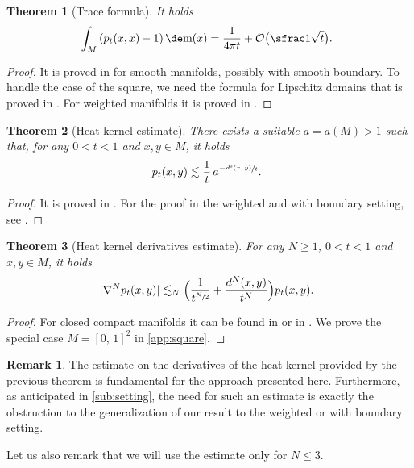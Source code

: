 \documentclass[10pt]{amsart}
\theoremstyle{plain}
\newtheorem{theorem}[theorem]{Theorem}
\theoremstyle{definition}
\newtheorem{remark}[remark]{Remark}
\numberwithin{equation}{section}
\newcommand{\bigo}{\ensuremath{\mathcal{O}}}
\newcommand{\cc}[2]{\ensuremath{\left[#1,\,#2\right]}}
\newcommand{\fullstop}{\ensuremath{\text{. }}}
\newcommand{\m}{\ensuremath{\mathrm m}}
\DeclarePairedDelimiter\abs{\lvert}{\rvert}
\begin{document}
\begin{theorem}[Trace formula]\label{thm:heat_ondiag}
It holds
\begin{equation*}
\int_M \left(p_t(x,x)-1\right)\de\m(x) = \frac 1{4\pi t} + \bigo\bigl(\sfrac 1{\sqrt{t}}\bigr)\fullstop
\end{equation*}
\end{theorem}
\begin{proof}
It is proved in \cite{McKeanSinger67} for smooth manifolds, possibly with smooth boundary.
To handle the case of the square, we need the formula for Lipschitz domains that is proved
in \cite{brown1993}.
For weighted manifolds it is proved in \cite[Th.\,1.5]{charalambous2017}.
\end{proof}

\begin{theorem}[Heat kernel estimate]\label{thm:heat_estimate}
There exists a suitable $a=a(M)>1$ such that, for any $0<t<1$ and $x,y\in M$, it holds
\begin{equation*}
p_t(x,y) \lesssim \frac 1t \,a^{-\sfrac{d^2(x,y)}{t}} \fullstop
\end{equation*}
\end{theorem}
\begin{proof}
It is proved in \cite[Th.\,4, Rem.\;at p.\,1050]{ChengLiYau81}.
For the proof in the weighted and with boundary setting, see \cite[Th.\,1.2]{Jiang-Li-Zhang15}.
\end{proof}

\begin{theorem}[Heat kernel derivatives estimate]\label{thm:heat_deriv}
For any $N\ge 1$, $0<t<1$ and $x,y\in M$, it holds
\begin{equation*}
\abs{\nabla^N p_t(x,y)} \lesssim_N
\Bigl(\frac 1{t^{\sfrac N2}} + \frac{d^N(x,y)}{t^N}\Bigr)p_t(x,y) \fullstop
\end{equation*}
\end{theorem}
\begin{proof}
For closed compact manifolds it can be found in \cite{stroock1998} or in \cite[Cor.\,1.2]{Hsu99}.
We prove the special case $M=\cc01^2$ in \cref{app:square}.
\end{proof}
\begin{remark}
The estimate on the derivatives of the heat kernel provided by the previous theorem is
fundamental for the approach presented here.
Furthermore, as anticipated in \cref{sub:setting}, the need for such an estimate is
exactly the obstruction to the generalization of our result to the weighted or with boundary setting.

Let us also remark that we will use the estimate only for $N\le 3$.
\end{remark}
\end{document}
